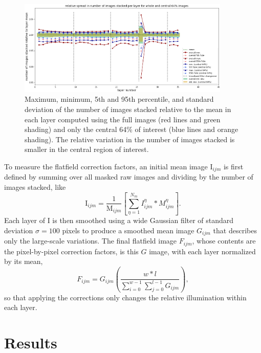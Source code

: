 \documentclass[letterpaper,11pt]{article}
\newcommand{\Iota}{\mathrm{I}}
\newcommand{\Mu}{\mathrm{M}}
\begin{document}
\begin{figure}[!ht]
\centering
\includegraphics[width=0.90\textwidth]{images/measuring_flatfield_corrections/mask_stack_variation_reduction}
\caption{\footnotesize Maximum, minimum, 5th and 95th percentile, and standard deviation of the number of images stacked relative to the mean in each layer computed using the full images (red lines and green shading) and only the central 64\% of interest (blue lines and orange shading). The relative variation in the number of images stacked is smaller in the central region of interest.}
\label{fig:removing_image_edges_effect_on_mask_stacks}
\end{figure} 

To measure the flatfield correction factors, an initial mean image $\Iota_{ijm}$ is first defined by summing over all masked raw images and dividing by the number of images stacked, like
\begin{equation}
\Iota_{ijm} = \frac{1}{\Mu_{ijm}} \left[ \sum_{\eta=1}^{N_{m}} I^{\eta}_{ijm}*M^{\eta}_{ijm} \right] .
\end{equation}
Each layer of $\Iota$ is then smoothed using a wide Gaussian filter of standard deviation $\sigma=100$ pixels to produce a smoothed mean image $G_{ijm}$ that describes only the large-scale variations. The final flatfield image $F_{ijm}$, whose contents are the pixel-by-pixel correction factors, is this $G$ image, with each layer normalized by its mean,
\begin{equation}
F_{ijm} = G_{ijm} \left( \frac{w*l}{\sum_{i=0}^{w-1}\sum_{j=0}^{l-1}G_{ijm}} \right) ,
\end{equation}
so that applying the corrections only changes the relative illumination within each layer. 

\section{Results}
\label{sec:results}
\end{document}
